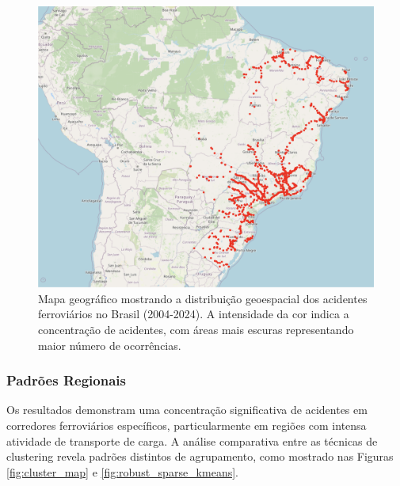 \documentclass[conference]{IEEEtran}
\begin{document}
\begin{figure}[h]
    \centering
    \includegraphics[width=0.99\linewidth]{accident_map.png}
    \caption{Mapa geográfico mostrando a distribuição geoespacial dos acidentes ferroviários no Brasil (2004-2024). A intensidade da cor indica a concentração de acidentes, com áreas mais escuras representando maior número de ocorrências.}
    \label{fig:accident_map}
\end{figure}


\subsubsection{Padrões Regionais}
Os resultados demonstram uma concentração significativa de acidentes em corredores ferroviários específicos, particularmente em regiões com intensa atividade de transporte de carga. A análise comparativa entre as técnicas de clustering revela padrões distintos de agrupamento, como mostrado nas Figuras \ref{fig:cluster_map} e \ref{fig:robust_sparse_kmeans}.
\end{document}
